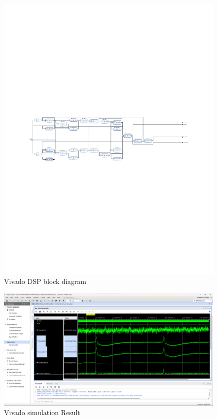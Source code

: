 \begin{landscape}\centering
\vspace*{\fill}
\begin{figure}[h]
\centering
\includegraphics[width=1\linewidth]{4-ANC_Sys/VivadoBD_DSP.pdf}
\caption{Vivado DSP block diagram}
\label{fig_VivadoBD_DSP}
\end{figure}
\vfill
\end{landscape}

\begin{figure}[h]
\centering
\includegraphics[width=1\linewidth]{4-ANC_Sys/VivadoSim.png}
\caption{Vivado simulation Result}
\label{fig_VivadoSimResult}
\end{figure}


